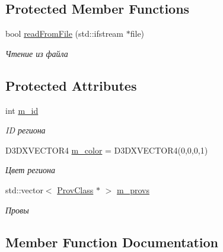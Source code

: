 \subsection*{Protected Member Functions}
\begin{DoxyCompactItemize}
\item 
bool \hyperlink{class_prov_region_class_ae6a10139f79ab3a22d28422b433f588b}{read\+From\+File} (std\+::ifstream $\ast$file)
\begin{DoxyCompactList}\small\item\em Чтение из файла \end{DoxyCompactList}\end{DoxyCompactItemize}
\subsection*{Protected Attributes}
\begin{DoxyCompactItemize}
\item 
int \hyperlink{class_prov_region_class_a507b91b7ae0374d4e4b0816dc3dc0c62}{m\+\_\+id}
\begin{DoxyCompactList}\small\item\em ID региона \end{DoxyCompactList}\item 
D3\+D\+X\+V\+E\+C\+T\+O\+R4 \hyperlink{class_prov_region_class_a8782e9c8135dbf5f89f0b0b64649a129}{m\+\_\+color} = D3\+D\+X\+V\+E\+C\+T\+O\+R4(0,0,0,1)
\begin{DoxyCompactList}\small\item\em Цвет региона \end{DoxyCompactList}\item 
std\+::vector$<$ \hyperlink{class_prov_class}{Prov\+Class} $\ast$ $>$ \hyperlink{class_prov_region_class_a2597561e1bac7e8514c57e9db3620e17}{m\+\_\+provs}
\begin{DoxyCompactList}\small\item\em Провы \end{DoxyCompactList}\end{DoxyCompactItemize}


\subsection{Member Function Documentation}
\mbox{\label{class_block_region_class_a95052be1d1d550dab72197af99f4d4e1}} 
